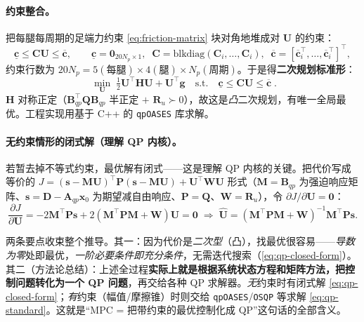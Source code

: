 \paragraph{约束整合。}
把每腿每周期的足端力约束 \cref{eq:friction-matrix} 块对角地堆成对 $\mathbf{U}$ 的约束\cite{yu2021quadruped}：
\begin{equation}
  \underline{\mathbf{c}}\le\mathbf{C}\mathbf{U}\le\overline{\mathbf{c}},\qquad
  \underline{\mathbf{c}}=\mathbf{0}_{20N_p\times1},\;\;
  \mathbf{C}=\mathrm{blkdiag}(\mathbf{C}_i,\dots,\mathbf{C}_i),\;\;
  \overline{\mathbf{c}}=[\overline{\mathbf{c}}_i^\top,\dots,\overline{\mathbf{c}}_i^\top]^\top,
  \label{eq:qp-constraint}
\end{equation}
约束行数为 $20N_p=5(\text{每腿})\times4(\text{腿})\times N_p(\text{周期})$。于是得\textbf{二次规划标准形}\cite{yu2021quadruped}：
\begin{equation}
  \boxed{\;\min_{\mathbf{U}}\;\tfrac12\mathbf{U}^\top\mathbf{H}\mathbf{U}+\mathbf{U}^\top\mathbf{g}\quad\text{s.t.}\quad\underline{\mathbf{c}}\le\mathbf{C}\mathbf{U}\le\overline{\mathbf{c}}\;}.
  \label{eq:qp-standard}
\end{equation}
$\mathbf{H}$ 对称正定（$\mathbf{B}_{qp}^\top\mathbf{Q}\mathbf{B}_{qp}$ 半正定 $+$ $\mathbf{R}_u\succ0$），故这是\emph{凸}二次规划，有唯一全局最优。工程实现用基于 C++ 的 \texttt{qpOASES} 库求解\cite{yu2021quadruped}。

\paragraph{无约束情形的闭式解（理解 QP 内核）。}
若暂去掉不等式约束，最优解有闭式——这是理解 QP 内核的关键。把代价写成等价的 $J=(\mathbf{s}-\mathbf{M}\mathbf{U})^\top\mathbf{P}(\mathbf{s}-\mathbf{M}\mathbf{U})+\mathbf{U}^\top\mathbf{W}\mathbf{U}$ 形式（$\mathbf{M}=\mathbf{B}_{qp}$ 为强迫响应矩阵、$\mathbf{s}=\mathbf{D}-\mathbf{A}_{qp}\boldsymbol{x}_0$ 为期望减自由响应、$\mathbf{P}=\mathbf{Q}$、$\mathbf{W}=\mathbf{R}_u$），令 $\partial J/\partial\mathbf{U}=\mathbf{0}$\cite{yu2021quadruped}：
\begin{equation}
  \frac{\partial J}{\partial\mathbf{U}}=-2\mathbf{M}^\top\mathbf{P}\mathbf{s}+2(\mathbf{M}^\top\mathbf{P}\mathbf{M}+\mathbf{W})\mathbf{U}=\mathbf{0}
  \;\Longrightarrow\;
  \boxed{\hat{\mathbf{U}}=(\mathbf{M}^\top\mathbf{P}\mathbf{M}+\mathbf{W})^{-1}\mathbf{M}^\top\mathbf{P}\mathbf{s}}.
  \label{eq:qp-closed-form}
\end{equation}

\begin{insight}[二次型 $\Rightarrow$ 导数为零即唯一全局最优；MPC 本质 = 化为 QP]\label{ins:qp-essence}
两条要点收束整个推导。其一：因为代价是\emph{二次型}（凸），找最优很容易——\emph{导数为零}处即最优，\emph{一阶必要条件即充分条件}，无需迭代搜索（\cref{eq:qp-closed-form}）。其二（方法论总结）：上述全过程\textbf{实际上就是根据系统状态方程和矩阵方法，把控制问题转化为一个 QP 问题}，再交给各种 QP 求解器。\emph{无}约束时有闭式解 \cref{eq:qp-closed-form}；\emph{有}约束（幅值/摩擦锥）时则交给 \texttt{qpOASES}/\allowbreak\texttt{OSQP} 等求解 \cref{eq:qp-standard}。这就是“MPC = 把带约束的最优控制化成 QP”这句话的全部含义。
\end{insight}

